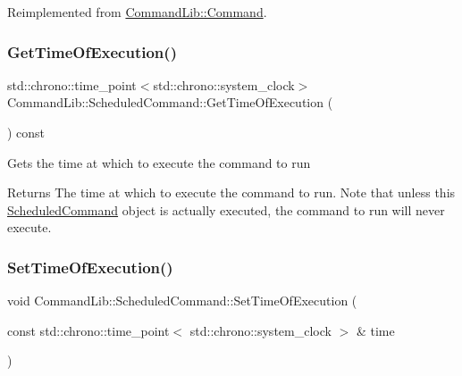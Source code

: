Reimplemented from \mbox{\hyperlink{class_command_lib_1_1_command_a795a185509e7b0fc1606b3b62fe17fbb}{Command\+Lib\+::\+Command}}.

\mbox{\label{class_command_lib_1_1_scheduled_command_a283025c9c8efe2cad78a7bcdb724c614}} 
\subsubsection{\texorpdfstring{Get\+Time\+Of\+Execution()}{GetTimeOfExecution()}}
{\footnotesize\ttfamily std\+::chrono\+::time\+\_\+point$<$std\+::chrono\+::system\+\_\+clock$>$ Command\+Lib\+::\+Scheduled\+Command\+::\+Get\+Time\+Of\+Execution (\begin{DoxyParamCaption}{ }\end{DoxyParamCaption}) const}



Gets the time at which to execute the command to run

\begin{DoxyReturn}{Returns}
The time at which to execute the command to run. Note that unless this \mbox{\hyperlink{class_command_lib_1_1_scheduled_command}{Scheduled\+Command}} object is actually executed, the command to run will never execute. 
\end{DoxyReturn}
\mbox{\label{class_command_lib_1_1_scheduled_command_a12535fdcde6fe3ca5646a12b53c5302e}} 
\subsubsection{\texorpdfstring{Set\+Time\+Of\+Execution()}{SetTimeOfExecution()}}
{\footnotesize\ttfamily void Command\+Lib\+::\+Scheduled\+Command\+::\+Set\+Time\+Of\+Execution (\begin{DoxyParamCaption}\item[{const std\+::chrono\+::time\+\_\+point$<$ std\+::chrono\+::system\+\_\+clock $>$ \&}]{time }\end{DoxyParamCaption})}



